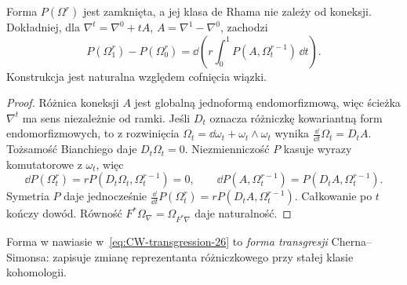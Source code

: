 \begin{twierdzenie}
\label{thm:chern-weil-26}
Forma $P(\Omega^r)$ jest zamknięta,
a jej klasa de Rhama nie zależy od koneksji.
Dokładniej, dla $\nabla^t=\nabla^0+tA$,
$A=\nabla^1-\nabla^0$, zachodzi
\begin{equation}\label{eq:CW-transgression-26}
 P(\Omega_1^r)-P(\Omega_0^r)
 =\dd\left(r\int_0^1
       P(A,\Omega_t^{r-1})\,\dd t\right).
\end{equation}
Konstrukcja jest naturalna względem cofnięcia wiązki.
\end{twierdzenie}
\begin{proof}
Różnica koneksji $A$ jest globalną jednoformą
endomorfizmową, więc ścieżka $\nabla^t$
ma sens niezależnie od ramki.
Jeśli $D_t$ oznacza różniczkę kowariantną
form endomorfizmowych, to z rozwinięcia
$\Omega_t=\dd\omega_t+\omega_t\wedge\omega_t$
wynika $\frac{\dd}{\dd t}\Omega_t=D_tA$.
Tożsamość Bianchiego daje $D_t\Omega_t=0$.
Niezmienniczość $P$ kasuje wyrazy
komutatorowe z $\omega_t$, więc
\[
 \dd P(\Omega_t^r)=
  rP(D_t\Omega_t,\Omega_t^{r-1})=0,\qquad
 \dd P(A,\Omega_t^{r-1})
  =P(D_tA,\Omega_t^{r-1}).
\]
Symetria $P$ daje jednocześnie
$\frac{\dd}{\dd t}P(\Omega_t^r)
=rP(D_tA,\Omega_t^{r-1})$.
Całkowanie po $t$ kończy dowód.
Równość $F^*\Omega_\nabla=\Omega_{F^*\nabla}$
daje naturalność.
\end{proof}

Forma w nawiasie w~\eqref{eq:CW-transgression-26}
to \emph{forma transgresji} Cherna--Simonsa:
zapisuje zmianę reprezentanta różniczkowego
przy stałej klasie kohomologii.

